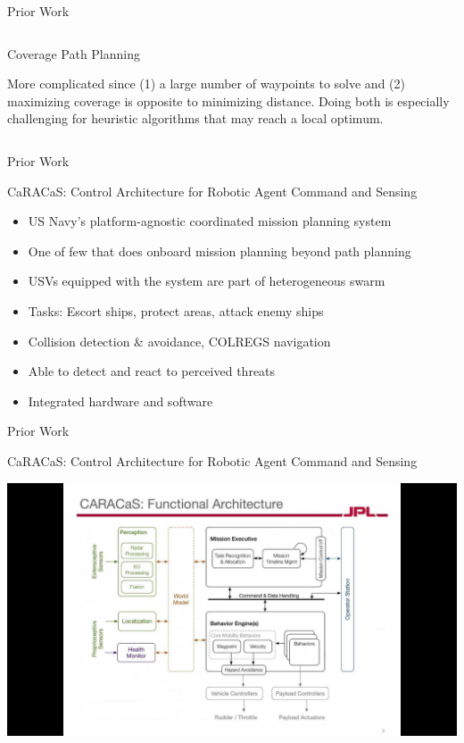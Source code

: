 \documentclass[9pt]{beamer}
\begin{document}
\begin{frame}{Prior Work}
\begin{columns}
\begin{column}{0.45\textwidth}
\begin{block}{Coverage Path Planning}
\begin{center}
                    \linebreak
                    More complicated since (1) a large number of waypoints to solve and (2) maximizing coverage is opposite to minimizing distance. Doing both is especially challenging for heuristic algorithms that may reach a local optimum.
                \end{center}
            \end{block}
        \end{column}
    \end{columns}
\end{frame}

\begin{frame}{Prior Work}
    \begin{block}{CaRACaS: Control Architecture for Robotic Agent Command and Sensing}
	    \begin{itemize}
	        \item US Navy's platform-agnostic coordinated mission planning system
    	    \item One of few that does onboard mission planning beyond path planning
            \item USVs equipped with the system are part of heterogeneous swarm
	        \item Tasks: Escort ships, protect areas, attack enemy ships
    	    \item Collision detection \& avoidance, COLREGS navigation
    	    \item Able to detect and react to perceived threats
    	    \item Integrated hardware and software
    	    \end{itemize}
    \end{block}
\end{frame}  

\begin{frame}{Prior Work}
    \begin{block}{CaRACaS: Control Architecture for Robotic Agent Command and Sensing}
        \begin{center}
            \includegraphics[width=\textwidth,trim={7cm 1cm 7cm 4cm},clip]{img/caracas.jpg}
        \end{center}
    \end{block}
\end{frame}
\end{document}
